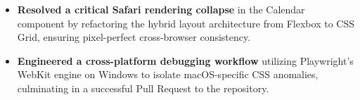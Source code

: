 \begin{itemize}
  \item \textbf{Resolved a critical Safari rendering collapse} in the Calendar component by refactoring the hybrid layout architecture from Flexbox to CSS Grid, ensuring pixel-perfect cross-browser consistency.
  \item \textbf{Engineered a cross-platform debugging workflow} utilizing Playwright's WebKit engine on Windows to isolate macOS-specific CSS anomalies, culminating in a successful Pull Request to the repository.
\end{itemize}